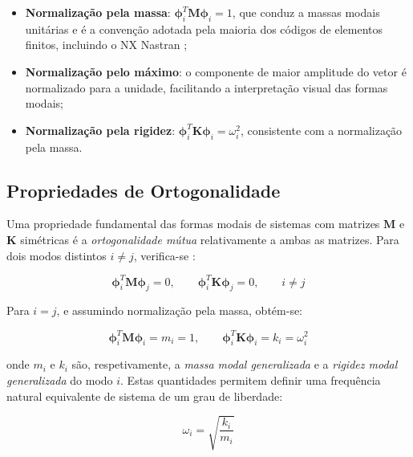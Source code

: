 \documentclass[11pt,twoside,a4paper]{report}
\begin{document}
\begin{itemize}
    \item \textbf{Normalização pela massa}: $\boldsymbol{\phi}_i^T \mathbf{M} \boldsymbol{\phi}_i = 1$, que conduz a massas modais unitárias e é a convenção adotada pela maioria dos códigos de elementos finitos, incluindo o NX Nastran \cite{Nastran2014};
    
    \item \textbf{Normalização pelo máximo}: o componente de maior amplitude do vetor é normalizado para a unidade, facilitando a interpretação visual das formas modais;
    
    \item \textbf{Normalização pela rigidez}: $\boldsymbol{\phi}_i^T \mathbf{K} \boldsymbol{\phi}_i = \omega_i^2$, consistente com a normalização pela massa.
\end{itemize}

\subsection{Propriedades de Ortogonalidade}

Uma propriedade fundamental das formas modais de sistemas com matrizes $\mathbf{M}$ e $\mathbf{K}$ simétricas é a \textit{ortogonalidade mútua} relativamente a ambas as matrizes. Para dois modos distintos $i \neq j$, verifica-se \cite{Clough1993, Inman2014}:

\begin{equation}
    \boldsymbol{\phi}_i^T \mathbf{M} \boldsymbol{\phi}_j = 0, \qquad 
    \boldsymbol{\phi}_i^T \mathbf{K} \boldsymbol{\phi}_j = 0, \qquad 
    i \neq j
    \label{eq:ortogonalidade}
\end{equation}

Para $i = j$, e assumindo normalização pela massa, obtém-se:

\begin{equation}
    \boldsymbol{\phi}_i^T \mathbf{M} \boldsymbol{\phi}_i = m_i = 1, 
    \qquad
    \boldsymbol{\phi}_i^T \mathbf{K} \boldsymbol{\phi}_i = k_i = 
    \omega_i^2
    \label{eq:massas_rigidezes_modais}
\end{equation}

\noindent onde $m_i$ e $k_i$ são, respetivamente, a \textit{massa modal generalizada} e a \textit{rigidez modal generalizada} do modo $i$. Estas quantidades permitem definir uma frequência natural equivalente de sistema de um grau de liberdade:

\begin{equation}
    \omega_i = \sqrt{\frac{k_i}{m_i}}
    \label{eq:omega_sdof}
\end{equation}
\end{document}

